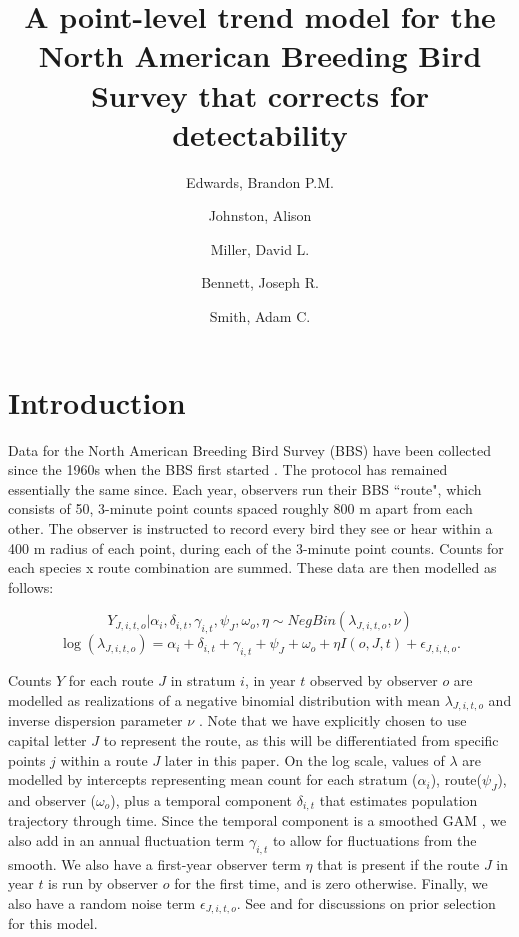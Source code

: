 \documentclass[12pt]{article}
\title{A point-level trend model for the North American Breeding Bird Survey that corrects for detectability}
\author{
	Edwards, Brandon P.M.\\
	\and
	Johnston, Alison\\
	\and
	Miller, David L.\\
	\and
	Bennett, Joseph R.\\
	\and
	Smith, Adam C.\\
}
\begin{document}
	
	\maketitle
	
		
	
\section{Introduction}
\par Data for the North American Breeding Bird Survey (BBS) have been collected since the 1960s when the BBS first started \citep{hudson_role_2017, sauer_first_2017}. 
The protocol has remained essentially the same since. 
Each year, observers run their BBS ``route", which consists of 50, 3-minute point counts spaced roughly 800 m apart from each other. 
The observer is instructed to record every bird they see or hear within a 400 m radius of each point, during each of the 3-minute point counts. 
Counts for each species x route combination are summed.
These data are then modelled as follows:

\begin{equation*}
	Y_{J,i,t,o} | \alpha_i, \delta_{i,t}, \gamma_{i,t}, \psi_J, \omega_o, \eta \sim NegBin(\lambda_{J,i,t,o}, \nu)
\end{equation*}
\begin{equation}\label{bbs}
\log(\lambda_{J,i,t,o}) = \alpha_i + \delta_{i,t} + \gamma_{i,t} + \psi_J + \omega_o + \eta I(o,J,t) + \epsilon_{J,i,t,o}.
\end{equation}

Counts $Y$ for each route $J$ in stratum $i$, in year $t$ observed by observer $o$ are modelled as realizations of a negative binomial distribution with mean $\lambda_{J,i,t,o}$ and inverse dispersion parameter $\nu$ \citet{smith_spatially_2023}. 
Note that we have explicitly chosen to use capital letter $J$ to represent the route, as this will be differentiated from specific points $j$ within a route $J$ later in this paper.
On the log scale, values of $\lambda$ are modelled by intercepts representing mean count for each stratum ($\alpha_i$), route($\psi_J$), and observer ($\omega_o$), plus a temporal component $\delta_{i,t}$ that estimates population trajectory through time. 
Since the temporal component is a smoothed GAM \citep{smith_north_2021}, we also add in an annual fluctuation term $\gamma_{i,t}$ to allow for fluctuations from the smooth. 
We also have a first-year observer term $\eta$ that is present if the route $J$ in year $t$ is run by observer $o$ for the first time, and is zero otherwise. 
Finally, we also have a random noise term $\epsilon_{J,i,t,o}$.
See \citet{smith_north_2021} and \citet{smith_spatially_2023} for discussions on prior selection for this model.
\end{document}
